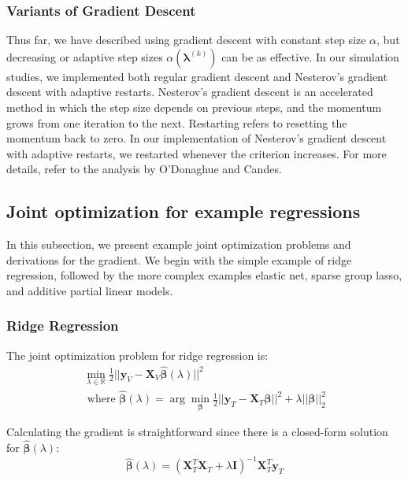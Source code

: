 \documentclass[10pt,letterpaper]{article}
\begin{document}
\subsubsection{Variants of Gradient Descent}

Thus far, we have described using gradient descent with constant step size $\alpha$, but decreasing or adaptive step sizes $\alpha(\boldsymbol{\lambda}^{(k)})$ can be as effective. In our simulation studies, we implemented both regular gradient descent and Nesterov's gradient descent with adaptive restarts. Nesterov's gradient descent is an accelerated method in which the step size depends on previous steps, and the momentum grows from one iteration to the next. Restarting refers to resetting the momentum back to zero. In our implementation of Nesterov's gradient descent with adaptive restarts, we restarted whenever the criterion increases. For more details, refer to the analysis by O'Donaghue and Candes.

\subsection{Joint optimization for example regressions}

In this subsection, we present example joint optimization problems and derivations for the gradient. We begin with the simple example of ridge regression, followed by the more complex examples elastic net, sparse group lasso, and additive partial linear models.

\subsubsection{Ridge Regression}

The joint optimization problem for ridge regression is:
\begin{equation}
\begin{array}{c}
\min_{\lambda\in \mathbb{R}} \frac{1}{2} \lvert\lvert \boldsymbol{y}_V - \boldsymbol{X}_V \hat{\boldsymbol{\beta}} (\lambda) \rvert\rvert ^2 \\
\text{  where  } \hat{\boldsymbol{\beta}} (\lambda) = \arg \min_{\boldsymbol{\beta}} \frac{1}{2} \lvert\lvert \boldsymbol{y}_T - \boldsymbol{X}_T \boldsymbol{\beta} \rvert\rvert ^2 + \lambda \lvert\lvert \boldsymbol{\beta} \rvert\rvert_2^2
\end{array}
\end{equation}

Calculating the gradient is straightforward since there is a closed-form solution for $\hat{\boldsymbol{\beta}}(\lambda)$:
\begin{equation}
\hat{\boldsymbol{\beta}} (\lambda) = (\boldsymbol{X}_T^T\boldsymbol{X}_T + \lambda \boldsymbol{I})^{-1}\boldsymbol{X}_T^T\boldsymbol{y}_T
\end{equation}
\end{document}
